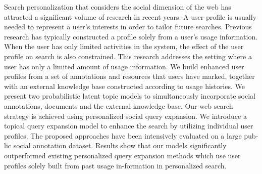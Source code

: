 Search personalization that considers the social dimension of the web has attracted a significant volume of research in recent years. A user profile is usually needed to represent a user's interests in order to tailor future searches. Previous research has typically constructed a profile solely from a user's usage information. When the user has only limited activities in the system, the effect of the user profile on search is also constrained. This research addresses the setting where a user has only a limited amount of usage information. We build enhanced user profiles from a set of annotations and resources that users have marked, together with an external knowledge base constructed according to usage histories. We present two probabilistic latent topic models to simultaneously incorporate social annotations, documents and the external knowledge base. Our web search strategy is achieved using personalized social query expansion. We introduce a topical query expansion model to enhance the search by utilizing individual user profiles. The proposed approaches have been intensively evaluated on a large pub-lic social annotation dataset. Results show that our models significantly outperformed existing personalized query expansion methods which use user profiles solely built from past usage in-formation in personalized search.
